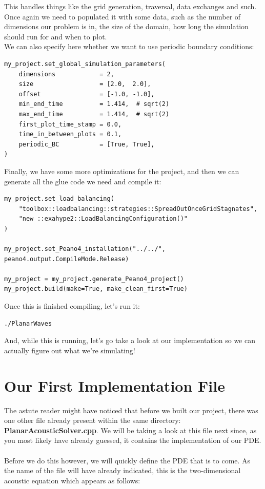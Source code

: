 \documentclass[12pt,letterpaper]{article}
\begin{document}
This handles things like the grid generation, traversal, data exchanges and such.
Once again we need to populated it with some data, such as the number of dimensions our problem is in,
the size of the domain, how long the simulation should run for and when to plot.\\

We can also specify here whether we want to use periodic boundary conditions:\\

\begin{lstlisting}[style = Python]
my_project.set_global_simulation_parameters(
    dimensions            = 2,
    size                  = [2.0,  2.0],
    offset                = [-1.0, -1.0],
    min_end_time          = 1.414,  # sqrt(2)
    max_end_time          = 1.414,  # sqrt(2)
    first_plot_time_stamp = 0.0,
    time_in_between_plots = 0.1,
    periodic_BC           = [True, True],
)
\end{lstlisting}

Finally, we have some more optimizations for the project, and then we can generate all the glue code we need and compile it:\\

\begin{lstlisting}[style = Python]
my_project.set_load_balancing(
    "toolbox::loadbalancing::strategies::SpreadOutOnceGridStagnates",
    "new ::exahype2::LoadBalancingConfiguration()"
)

my_project.set_Peano4_installation("../../", peano4.output.CompileMode.Release)

my_project = my_project.generate_Peano4_project()
my_project.build(make=True, make_clean_first=True)
\end{lstlisting}

Once this is finished compiling, let's run it:\\

\begin{lstlisting}[style = Bash]
./PlanarWaves
\end{lstlisting}

And, while this is running, let's go take a look at our implementation so we can actually figure out what we're simulating!

\newpage

\section{Our First Implementation File}
The astute reader might have noticed that before we built our project, there was one other file already present within the same directory: \textbf{PlanarAcousticSolver.cpp}.
We will be taking a look at this file next since, as you most likely have already guessed, it contains the implementation of our PDE.
\\ \\
Before we do this however, we will quickly define the PDE that is to come. As the name of the file will have already indicated,
this is the two-dimensional acoustic equation which appears as follows:
\end{document}
